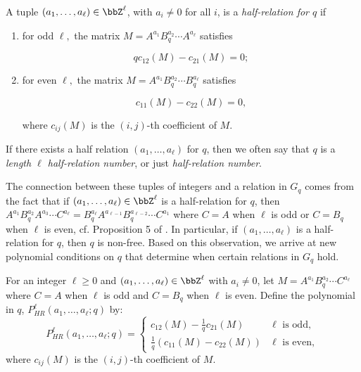 \documentclass[11 pt]{amsart}
\begin{document}
\begin{definition}
	A tuple $(a_1, \ldots, a_\ell)\in \bbZ^{\ell}$, with $a_i \neq 0$ for all $i$, is a \textit{half-relation for $q$} if

    \begin{enumerate}
        \item for odd $\ell,$ the matrix $M = A^{a_1}B_q^{a_2}\cdots A^{a_\ell}$ satisfies 

        \[q c_{12}(M) - c_{21}(M) = 0;\]

        \item for even $\ell,$ the matrix $M = A^{a_1}B_q^{a_2}\cdots B_q^{a_\ell}$ satisfies 

        \[c_{11}(M) - c_{22}(M) = 0,\]

        where $c_{ij}(M)$ is the $(i, j)$-th coefficient of $M$.
    \end{enumerate}

    If there exists a half relation $(a_1, \ldots, a_\ell)$ for $q$, then we often say that $q$ is a \textit{length $\ell$ half-relation number}, or just \textit{half-relation number}. 
    \end{definition}

    The connection between these tuples of integers and a relation in $G_q$ comes from the fact that if $(a_1,\ldots,a_\ell)\in\bbZ^\ell$ is a half-relation for $q$, then $A^{a_1}B_q^{a_2}A^{a_3}\cdots C^{a_\ell}=B_q^{a_\ell}A^{a_{\ell-1}}B_q^{a_{\ell-2}}\cdots C^{a_1}$ where $C=A$ when $\ell$ is odd or $C=B_q$ when $\ell$ is even, cf. Proposition 5 of \cite{Smilga2021}. In particular, if $(a_1,\ldots,a_\ell)$ is a half-relation for $q$, then $q$ is non-free. Based on this observation, we arrive at new polynomial conditions on $q$ that determine when certain relations in $G_q$ hold.
  
    \begin{definition}\label{def:PHR}
      For an integer $\ell \ge 0$ and $(a_1, \ldots,a_\ell)\in\bbZ^\ell$ with $a_i\neq 0$, let $M=A^{a_1}B_q^{a_2}\cdots C^{a_\ell}$ where $C=A$ when $\ell$ is odd and $C=B_q$ when $\ell$ is even. Define the polynomial in $q$, $P_{HR}^\ell(a_1,\ldots,a_\ell;q)$ by:
      \[
      P^\ell_{HR}(a_1,\ldots,a_\ell; q)=\begin{cases}
          c_{12}(M)-\frac{1}{q}c_{21}(M) & \ell\textrm{\ is odd},\\
          \frac{1}{q}(c_{11}(M)-c_{22}(M)) & \ell\textrm{\ is even},
      \end{cases}
      \]
    where $c_{ij}(M)$ is the $(i, j)$-th coefficient of $M$. 
    \end{definition}
\end{document}
